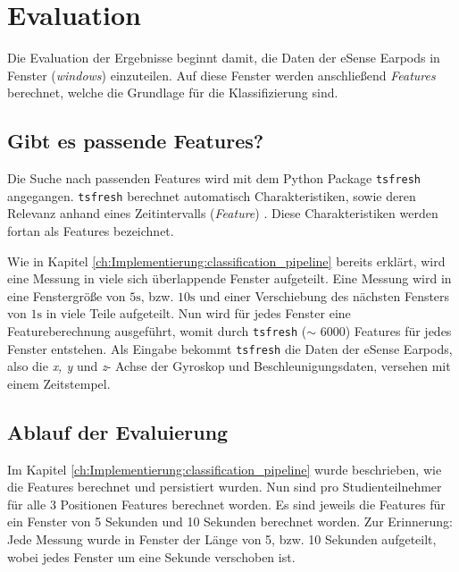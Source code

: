 
\chapter{Evaluation}
\label{ch:Evaluation}
Die Evaluation der Ergebnisse beginnt damit, die Daten der eSense Earpods in Fenster (\textit{windows}) einzuteilen.
Auf diese Fenster werden anschließend \textit{Features} berechnet, welche die Grundlage für die Klassifizierung sind.

\section{Gibt es passende Features?}
Die Suche nach passenden Features wird mit dem Python Package \texttt{tsfresh} angegangen.
\texttt{tsfresh} berechnet automatisch Charakteristiken, sowie deren Relevanz anhand eines Zeitintervalls (\textit{Feature}) \cite{TsfreshTsfresh12}.
Diese Charakteristiken werden fortan als Features bezeichnet.

Wie in Kapitel \ref{ch:Implementierung:classification_pipeline} bereits erklärt, wird eine Messung in viele sich überlappende Fenster aufgeteilt. 
Eine Messung wird in eine Fenstergröße von $5\si{\s}$, bzw. $10\si{\s}$ und einer Verschiebung des nächsten Fensters von $1\si{\s}$ in viele Teile aufgeteilt. 
Nun wird für jedes Fenster eine Featureberechnung ausgeführt, womit durch \texttt{tsfresh} ($\sim$ 6000) Features für jedes Fenster entstehen.
Als Eingabe bekommt \texttt{tsfresh} die Daten der eSense Earpods, also die \textit{x, y} und \textit{z}- Achse der Gyroskop und Beschleunigungsdaten, versehen mit einem Zeitstempel. 

\section{Ablauf der Evaluierung}
Im Kapitel \ref{ch:Implementierung:classification_pipeline} wurde beschrieben, wie die Features berechnet und persistiert wurden. 
Nun sind pro Studienteilnehmer für alle 3 Positionen Features berechnet worden. 
Es sind jeweils die Features für ein Fenster von 5 Sekunden und 10 Sekunden berechnet worden.
Zur Erinnerung: Jede Messung wurde in Fenster der Länge von 5, bzw. 10 Sekunden aufgeteilt, wobei jedes Fenster um eine Sekunde verschoben ist.

